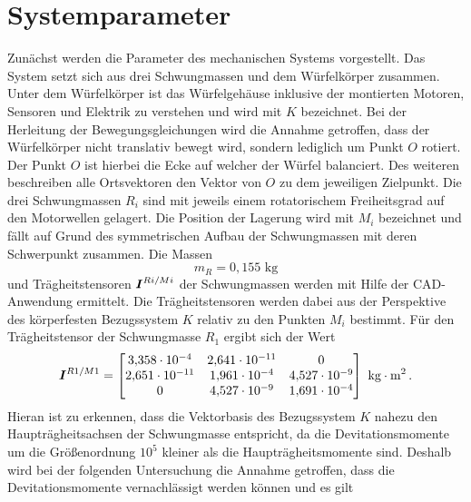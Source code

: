 \section{Systemparameter}\label{TM_3D_Systemparameter}
Zunächst werden die Parameter des mechanischen Systems vorgestellt. Das System setzt sich aus drei Schwungmassen und dem Würfelkörper zusammen. Unter dem Würfelkörper ist das Würfelgehäuse inklusive der montierten Motoren, Sensoren und Elektrik zu verstehen und wird mit $K$ bezeichnet. Bei der Herleitung der Bewegungsgleichungen wird die Annahme getroffen, dass der Würfelkörper nicht translativ bewegt wird, sondern lediglich um Punkt $O$ rotiert. Der Punkt $O$ ist hierbei die Ecke auf welcher der Würfel balanciert. Des weiteren beschreiben alle Ortsvektoren den Vektor von $O$ zu dem jeweiligen Zielpunkt. Die drei Schwungmassen $R_i$ sind mit jeweils einem rotatorischem Freiheitsgrad auf den Motorwellen gelagert. Die Position der Lagerung wird mit $M_i$ bezeichnet und fällt auf Grund des symmetrischen Aufbau der Schwungmassen mit deren Schwerpunkt zusammen.
Die Massen
\begin{equation}
m_R = 0{,}155\text{ kg}
\end{equation}
und Trägheitstensoren $\boldsymbol{I}^{Ri/Mi}$ der Schwungmassen werden mit Hilfe der CAD-Anwendung ermittelt. 
Die Trägheitstensoren werden dabei aus der Perspektive des körperfesten Bezugssystem $K$ relativ zu den Punkten $M_i$ bestimmt. Für den Trägheitstensor der Schwungmasse $R_1$ ergibt sich der Wert
\begin{equation}
 \boldsymbol{I}^{R1/M1} = \begin{bmatrix}
3{,}358\cdot 10^{-4} & 2{,}641\cdot 10^{-11} & 0 
\\
2{,}651\cdot 10^{-11} & 1{,}961\cdot 10^{-4} & 4{,}527\cdot 10^{-9} 
\\
0 & 4{,}527\cdot 10^{-9} & 1{,}691\cdot 10^{-4}
\end{bmatrix} \text{ kg}\cdot \text{m}^2 \,.
\end{equation}
Hieran ist zu erkennen, dass die Vektorbasis des Bezugssystem $K$ nahezu den Haupträgheitsachsen der Schwungmasse entspricht, da die Devitationsmomente um die Größenordnung $10^{5}$ kleiner als die Haupträgheitsmomente sind. Deshalb wird bei der  
folgenden Untersuchung die Annahme getroffen, dass die Devitationsmomente vernachlässigt werden können und es gilt 
